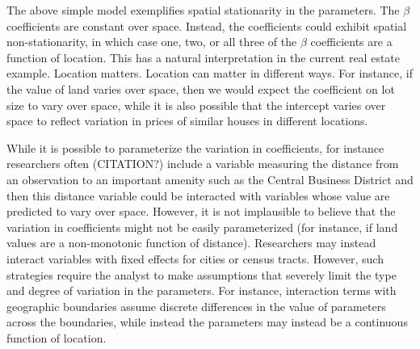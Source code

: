 \documentclass{article}\usepackage[]{graphicx}\usepackage[]{color}
\begin{document}
The above simple model exemplifies spatial stationarity in the parameters. The $\beta$ coefficients are constant over space. Instead, the coefficients could exhibit spatial non-stationarity, in which case one, two, or all three of the $\beta$ coefficients are a function of location. This has a natural interpretation in the current real estate example. Location matters. Location can matter in different ways. For instance, if the value of land varies over space, then we would expect the coefficient on lot size to vary over space, while it is also possible that the intercept varies over space to reflect variation in prices of similar houses in different locations. 

While it is possible to parameterize the variation in coefficients, for instance researchers often (CITATION?) include a variable measuring the distance from an observation to an important amenity such as the Central Business District and then this distance variable could be interacted with variables whose value are predicted to vary over space. However, it is not implausible to believe that the variation in coefficients might not be easily parameterized (for instance, if land values are a non-monotonic function of distance). Researchers may instead interact variables with fixed effects for cities or census tracts. However, such strategies require the analyst to make assumptions that severely limit the type and degree of variation in the parameters. For instance, interaction terms with geographic boundaries assume discrete differences in the value of parameters across the boundaries, while instead the parameters may instead be a continuous function of location.
\end{document}
